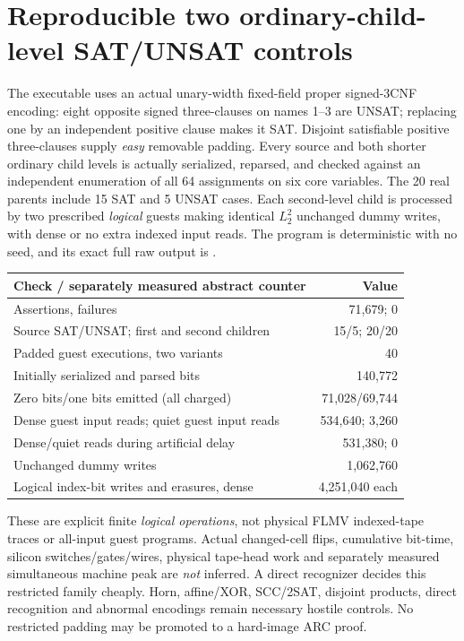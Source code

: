 \documentclass[11pt]{article}
\begin{document}
\section{Reproducible two ordinary-child-level SAT/UNSAT controls}
The executable
uses an actual unary-width fixed-field proper signed-3CNF
encoding: eight opposite signed three-clauses on names 1--3
are UNSAT; replacing one by an independent positive clause
makes it SAT. Disjoint satisfiable positive three-clauses
supply \emph{easy} removable padding. Every source and both
shorter ordinary child levels is actually serialized,
reparsed, and checked against an independent enumeration of
all 64 assignments on six core variables.
The 20 real parents include 15 SAT and 5 UNSAT cases.
Each second-level child is processed by two prescribed
\emph{logical} guests making identical $L_2^2$
unchanged dummy writes, with dense or no extra indexed
input reads. The program is deterministic with no seed,
and its exact full raw output is
.
\begin{center}\begin{tabular}{lr}\toprule
Check / separately measured abstract counter & Value\\\midrule
Assertions, failures & 71,679; 0\\
Source SAT/UNSAT; first and second children & 15/5; 20/20\\
Padded guest executions, two variants & 40\\
Initially serialized and parsed bits & 140,772\\
Zero bits/one bits emitted (all charged) & 71,028/69,744\\
Dense guest input reads; quiet guest input reads & 534,640; 3,260\\
Dense/quiet reads during artificial delay & 531,380; 0\\
Unchanged dummy writes & 1,062,760\\
Logical index-bit writes and erasures, dense & 4,251,040 each\\
\bottomrule\end{tabular}\end{center}
These are explicit finite \emph{logical operations}, not
physical FLMV indexed-tape traces or all-input guest programs.
Actual changed-cell flips, cumulative bit-time, silicon
switches/gates/wires, physical tape-head work and separately
measured simultaneous machine peak are \emph{not}
inferred. A direct recognizer decides this restricted
family cheaply. Horn, affine/XOR, SCC/2SAT, disjoint
products, direct recognition and abnormal encodings
remain necessary hostile controls. No restricted padding
may be promoted to a hard-image ARC proof.
\end{document}
